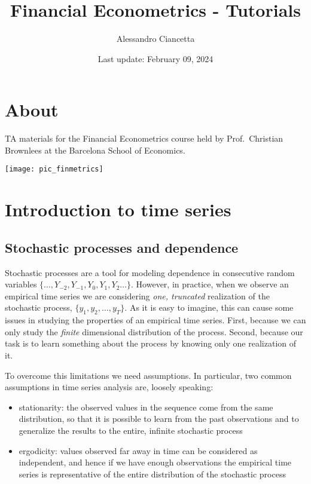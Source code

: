 \documentclass[
]{book}
\title{Financial Econometrics - Tutorials}
\author{Alessandro Ciancetta}
\date{Last update: February 09, 2024}
\begin{document}
\maketitle

{
\setcounter{tocdepth}{1}
\tableofcontents
}
\hypertarget{about}{%
\chapter*{About}\label{about}}

TA materials for the Financial Econometrics course held by Prof.~Christian Brownlees at the Barcelona School of Economics.

\begin{center}\texttt{[image: pic\_finmetrics]} \end{center}

\hypertarget{session01}{%
\chapter{Introduction to time series}\label{session01}}

\hypertarget{stochastic-processes-and-dependence}{%
\section{Stochastic processes and dependence}\label{stochastic-processes-and-dependence}}

Stochastic processes are a tool for modeling dependence in consecutive random variables \(\{\dots, Y_{-2}, Y_{-1}, Y_{0}, Y_{1}, Y_{2} \dots\}\). However, in practice, when we observe an empirical time series we are considering \emph{one, truncated} realization of the stochastic process, \(\{y_1, y_2, \dots, y_T\}\). As it is easy to imagine, this can cause some issues in studying the properties of an empirical time series. First, because we can only study the \emph{finite} dimensional distribution of the process. Second, because our task is to learn something about the process by knowing only one realization of it.

To overcome this limitations we need assumptions. In particular, two common assumptions in time series analysis are, loosely speaking:

\begin{itemize}
\item
  stationarity: the observed values in the sequence come from the same distribution, so that it is possible to learn from the past observations and to generalize the results to the entire, infinite stochastic process
\item
  ergodicity: values observed far away in time can be considered as independent, and hence if we have enough observations the empirical time series is representative of the entire distribution of the stochastic process
\end{itemize}
\end{document}

